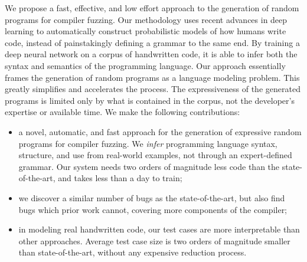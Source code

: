 We propose a fast, effective, and low effort approach to the generation of
random programs for compiler fuzzing. Our methodology uses recent advances in
deep learning to automatically construct probabilistic models of how humans
write code, instead of painstakingly defining a grammar to the same end. By
training a deep neural network on a corpus of handwritten code, it is able to
infer both the syntax and semantics of the programming language. Our approach
essentially frames the generation of random programs as a language modeling
problem. This greatly simplifies and accelerates the process. The
expressiveness of the generated programs is limited only by what is contained
in the corpus, not the developer's expertise or available time. We make the
following contributions:
%
\vspace{-.2em}
\begin{itemize}
  \itemsep0em
  \item a novel, automatic, and fast approach for the generation of expressive
  random programs for compiler fuzzing. We \emph{infer} programming language
  syntax, structure, and use from real-world examples, not through an
  expert-defined grammar. Our system needs two orders of magnitude less code
  than the state-of-the-art, and takes less than a day to train;
  \item we discover a similar number of bugs as the state-of-the-art, but also
  find bugs which prior work cannot, covering more components of the compiler;
  \item in modeling real handwritten code, our test cases are more
  interpretable than other approaches. Average test case size is two orders
  of magnitude smaller than state-of-the-art, without any expensive reduction
  process.
\end{itemize}
\vspace{-1em}
